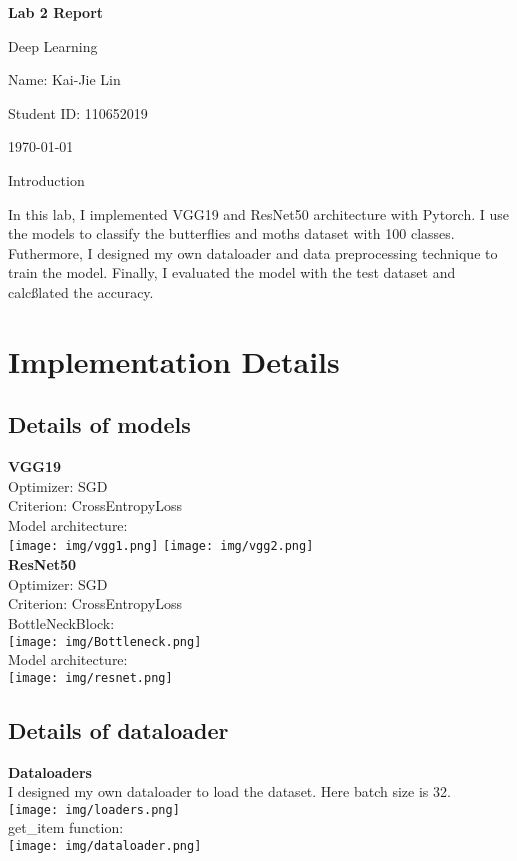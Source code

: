 \documentclass{article} %
\newcommand{\question}[2][]{\begin{flushleft}\textbf{Question #1}: \textit{#2}\end{flushleft}}
\newcommand{\maketitletwo}[2][]{\begin{center}
        \Large{\textbf{Lab 2 Report}
        
            Deep Learning} %
        \vspace{5pt}
        
        \normalsize{
            Name: Kai-Jie Lin 
            
            Student ID: 110652019
            
            \today}
        \vspace{15pt}
        \end{center}}
\begin{document}
    \maketitletwo[5]  %
    
    \section{Introduction}

    In this lab, I implemented VGG19 and ResNet50 architecture with Pytorch.
    I use the models to classify the butterflies and moths dataset with 100 classes.
    Futhermore, I designed my own dataloader and data preprocessing technique to train the model.
    Finally, I evaluated the model with the test dataset and calcßlated the accuracy.

    \section{Implementation Details}
    \subsection{Details of models}
    \textbf{VGG19} \\
    Optimizer: SGD \\
    Criterion: CrossEntropyLoss \\
    Model architecture: \\
    \texttt{[image: img/vgg1.png]}
    \texttt{[image: img/vgg2.png]}
    \\ \textbf{ResNet50} \\
    Optimizer: SGD \\
    Criterion: CrossEntropyLoss \\
    BottleNeckBlock: \\
    \texttt{[image: img/Bottleneck.png]} \\
    Model architecture: \\
    \texttt{[image: img/resnet.png]} \\

    \subsection{Details of dataloader}
    \textbf{Dataloaders} \\
    I designed my own dataloader to load the dataset. Here batch size is 32. \\
    \texttt{[image: img/loaders.png]} \\
    get\_item function: \\
    \texttt{[image: img/dataloader.png]} \\
\end{document}
